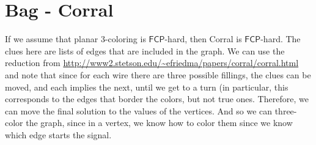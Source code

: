 \documentclass[runningheads,a4paper]{llncs}
\begin{document}
\section{Bag - Corral}

If we assume that planar 3-coloring is $\mathsf{FCP}$-hard, then Corral is $\mathsf{FCP}$-hard. The clues here are lists of edges that are included in the graph. We can use the reduction from \url{http://www2.stetson.edu/~efriedma/papers/corral/corral.html} and note that since for each wire there are three possible fillings, the clues can be moved, and each implies the next, until we get to a turn (in particular, this corresponds to the edges that border the colors, but not true ones. Therefore, we can move the final solution to the values of the vertices. And so we can  three-color the graph, since in a vertex, we know how to color them since we know which edge starts the signal.
\end{document}
